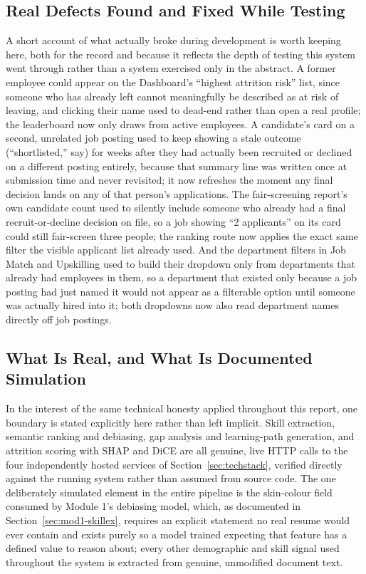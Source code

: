 \documentclass[11pt,a4paper]{article}
\begin{document}
\subsection{Real Defects Found and Fixed While Testing}

A short account of what actually broke during development is worth keeping here, both for the record and because it reflects the depth of testing this system went through rather than a system exercised only in the abstract. A former employee could appear on the Dashboard's ``highest attrition risk'' list, since someone who has already left cannot meaningfully be described as at risk of leaving, and clicking their name used to dead-end rather than open a real profile; the leaderboard now only draws from active employees. A candidate's card on a second, unrelated job posting used to keep showing a stale outcome (``shortlisted,'' say) for weeks after they had actually been recruited or declined on a different posting entirely, because that summary line was written once at submission time and never revisited; it now refreshes the moment any final decision lands on any of that person's applications. The fair-screening report's own candidate count used to silently include someone who already had a final recruit-or-decline decision on file, so a job showing ``2 applicants'' on its card could still fair-screen three people; the ranking route now applies the exact same filter the visible applicant list already used. And the department filters in Job Match and Upskilling used to build their dropdown only from departments that already had employees in them, so a department that existed only because a job posting had just named it would not appear as a filterable option until someone was actually hired into it; both dropdowns now also read department names directly off job postings.

\subsection{What Is Real, and What Is Documented Simulation}
\label{sec:frontend-honest}

In the interest of the same technical honesty applied throughout this report, one boundary is stated explicitly here rather than left implicit. Skill extraction, semantic ranking and debiasing, gap analysis and learning-path generation, and attrition scoring with SHAP and DiCE are all genuine, live HTTP calls to the four independently hosted services of Section~\ref{sec:techstack}, verified directly against the running system rather than assumed from source code. The one deliberately simulated element in the entire pipeline is the skin-colour field consumed by Module 1's debiasing model, which, as documented in Section~\ref{sec:mod1-skillex}, requires an explicit statement no real resume would ever contain and exists purely so a model trained expecting that feature has a defined value to reason about; every other demographic and skill signal used throughout the system is extracted from genuine, unmodified document text.
\end{document}
